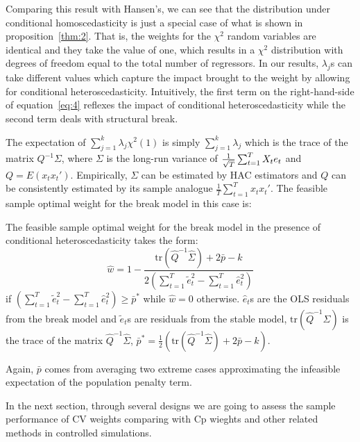 Comparing this result with Hansen's, we can see that the distribution under conditional homoscedasticity is just a special case of what is shown in proposition~\ref{thm:2}. That is, the weights for the $\chi^2$ random variables are identical and they take the value of one, which results in a $\chi^2$ distribution with degrees of freedom equal to the total number of regressors. In our results, $\lambda_j$s can take different values which capture the impact brought to the weight by allowing for conditional heteroscedasticity. Intuitively, the first term on the right-hand-side of equation~\ref{eq:4} reflexes the impact of conditional heteroscedasticity while the second term deals with structural break.

The expectation of $\sum_{j=1}^{k} \lambda_j \chi^2(1)$ is simply $\sum_{j=1}^{k} \lambda_j$ which is the trace of the matrix $Q^{-1} \Sigma$, where $\Sigma$ is the long-run variance of $\frac{1}{\sqrt{T}}\sum_{t=1}^{T} X_t e_t$ and $Q = E(x_t x_t')$. Empirically, $\Sigma$ can be estimated by HAC estimators and $Q$ can be consistently estimated by its sample analogue $\frac{1}{T}\sum_{t=1}^{T}x_t x_t'$. The feasible sample optimal weight for the break model in this case is:

\begin{corollary} \label{corollary:2}
The feasible sample optimal weight for the break model in the presence of conditional heteroscedasticity takes the form:
    \begin{equation} \label{eq:5}
    	\hat{w} = 1 - \frac{\mathrm{tr}\left(\hat{Q}^{-1}\hat{\Sigma}\right) + 2\bar{p} - k}{2\left(\sum_{t=1}^{T}\tilde{e}_t^2 - \sum_{t=1}^{T}\hat{e}_t^2\right)}
    \end{equation}
if $(\sum_{t=1}^{T}\tilde{e}_{t}^{2} - \sum_{t=1}^{T}\hat{e}_{t}^{2}) \geq \bar{p}^{*}$ while $\hat{w} = 0$ otherwise. $\hat{e}_t$s are the OLS residuals from the break model and $\tilde{e}_t$s are residuals from the stable model, $\mathrm{tr}(\hat{Q}^{-1}\hat{\Sigma})$ is the trace of the matrix $\hat{Q}^{-1}\hat{\Sigma}$, $\bar{p}^{*} = \frac{1}{2}(\mathrm{tr}(\hat{Q}^{-1}\hat{\Sigma}) + 2\bar{p} - k)$.
\end{corollary}

Again, $\bar{p}$ comes from averaging two extreme cases approximating the infeasible expectation of the population penalty term.

In the next section, through several designs we are going to assess the sample performance of CV weights comparing with Cp wieghts and other related methods in controlled simulations. 